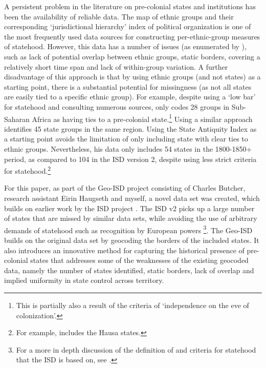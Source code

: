 \documentclass[12pt]{article}
\begin{document}
A persistent problem in the literature on pre-colonial states and institutions
has been the availability of reliable data. The \citet{Murdock1967} map of
ethnic groups and their corresponding `jurisdictional hierarchy' index of
political organization is one of the most frequently used data sources for
constructing per-ethnic-group measures of statehood. However, this data has a
number of issues (as enumerated by \citet{Michalopoulos2018}), such as lack of
potential overlap between ethnic groups, static borders, covering a relatively
short time span and lack of within-group variation. A further disadvantage of
this approach is that by using ethnic groups (and not states) as a starting
point, there is a substantial potential for missingness (as not all states are
easily tied to a specific ethnic group). For example, \citet{Paine2019} despite
using a `low bar' for statehood and consulting numerous sources, only codes 28
groups in Sub-Saharan Africa as having ties to a pre-colonial
state.\footnote{This is partially also a result of the criteria of `independence
on the eve of colonization'.} Using a similar approach \citet{Wig2016}
identifies 45 state groups in the same region. Using the State Antiquity Index
\citep{Bockstette2012} as a starting point \citet{Depetris-Chauvin2016} avoids
the limitation of only including state with clear ties to ethnic groups.
Nevertheless, his data only includes 54 states in the 1800-1850+ period, as
compared to 104 in the ISD version 2, despite using less strict criteria for
statehood.\footnote{For example, \citet{Depetris-Chauvin2016} includes the Hausa
states.}


For this paper, as part of the Geo-ISD project consisting of Charles Butcher,
research assistant Eirin Haugseth and myself, a novel data set was created,
which builds on earlier work by the ISD project \citep{Butcher2020}. The ISD v2
picks up a large number of states that are missed by similar data sets, while
avoiding the use of arbitrary demands of statehood such as recognition by
European powers \citep{Butcher2020}\footnote{For a more in depth discussion of
	the definition of and criteria for statehood that the ISD is based on,
see \citet{Butcher2017}.}. The Geo-ISD builds on the original data set by
geocoding the borders of the included states. It also introduces an innovative
method for capturing the historical presence of pre-colonial states that
addresses some of the weaknesses of the existing geocoded data, namely the
number of states identified, static borders, lack of overlap and implied
uniformity in state control across territory.
\end{document}
